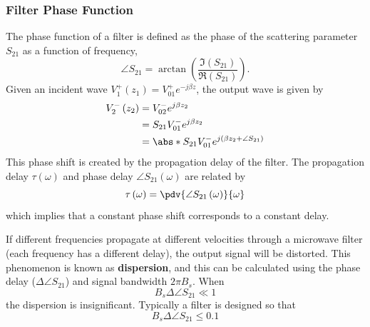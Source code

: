 \documentclass{article}
\begin{document}
\subsubsection{Filter Phase Function}
The phase function of a filter is defined as the phase of the
scattering parameter \(S_{21}\) as a function of frequency,
\begin{equation*}
    \angle S_{21} = \arctan{\left( \frac{\Im{\left( S_{21} \right)}}{\Re{\left( S_{21} \right)}} \right)}.
\end{equation*}
Given an incident wave \(V_1^+ \left( z_1 \right) = V_{01}^+ e^{-j \beta z}\),
the output wave is given by
\begin{align*}
    V_2^- \left( z_2 \right) & = V_{02}^- e^{j \beta z_2}                                              \\
                             & = S_{21} V_{01}^- e^{j \beta z_2}                                       \\
                             & = \abs*{S_{21}} V_{01}^- e^{j \left( \beta z_2 + \angle S_{21} \right)}
\end{align*}
This phase shift is created by the propagation delay of the filter.
The propagation delay \(\tau\left( \omega \right)\) and phase delay
\(\angle S_{21}\left( \omega \right)\) are related by
\begin{equation*}
    \tau\left( \omega \right) = \pdv{\angle S_{21}\left( \omega \right)}{\omega}
\end{equation*}
which implies that a constant phase shift corresponds to a constant delay.

If different frequencies propagate at different velocities through a
microwave filter (each frequency has a different delay), the output
signal will be distorted. This phenomenon is known as
\textbf{dispersion}, and this can be calculated using the phase delay
(\(\Delta \angle S_{21}\)) and signal bandwidth \(2\pi B_s\). When
\begin{equation*}
    B_s \Delta \angle S_{21} \ll 1
\end{equation*}
the dispersion is insignificant. Typically a filter is designed so that
\begin{equation*}
    B_s \Delta \angle S_{21} \leqslant 0.1
\end{equation*}
\end{document}
